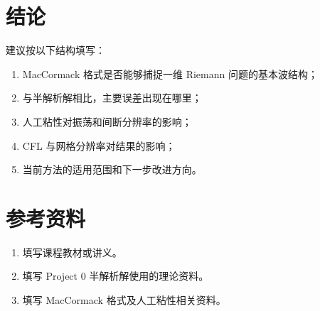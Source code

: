 \section{结论}

建议按以下结构填写：

\begin{enumerate}[leftmargin=2em]
    \item MacCormack 格式是否能够捕捉一维 Riemann 问题的基本波结构；
    \item 与半解析解相比，主要误差出现在哪里；
    \item 人工粘性对振荡和间断分辨率的影响；
    \item CFL 与网格分辨率对结果的影响；
    \item 当前方法的适用范围和下一步改进方向。
\end{enumerate}

\section*{参考资料}

\begin{enumerate}[leftmargin=2em]
    \item 填写课程教材或讲义。
    \item 填写 Project 0 半解析解使用的理论资料。
    \item 填写 MacCormack 格式及人工粘性相关资料。
\end{enumerate}
